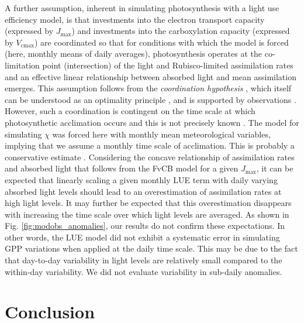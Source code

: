 \documentclass{myreport}
\newcommand{\vcmax}{$V_{\text{cmax}}$}
\newcommand{\jmax}{$J_{\text{max}}$}
\begin{document}
A further assumption, inherent in simulating photosynthesis with a light use efficiency model, is that investments into the electron transport capacity (expressed by \jmax ) and investments into the carboxylation capacity (expressed by \vcmax ) are coordinated so that for conditions with which the model is forced (here, monthly means of daily averages), photosynthesis operates at the co-limitation point (intersection) of the light and Rubisco-limited assimilation rates and an effective linear relationship between absorbed light and mean assimilation emerges. This assumption follows from the \textit{coordination hypothesis} \citep{chen93, haxeltine96}, which itself can be understood as an optimality principle \citep{haxeltine96}, and is supported by observations \citep{maire12po}. However, such a coordination is contingent on the time scale at which photosynthetic acclimation occurs and this is not precisely known \citep{smithdukes13gcb, way14}. The model for simulating $\chi$ was forced here with monthly mean meteorological variables, implying that we assume a monthly time scale of acclimation. This is probably a conservative estimate \citep{smithdukes17, veres84}. Considering the concave relationship of assimilation rates and absorbed light that follows from the FvCB model for a given \jmax , it can be expected that linearly scaling a given monthly LUE term with daily varying absorbed light levels should lead to an overestimation of assimilation rates at high light levels. It may further be expected that this overestimation disappears with increasing the time scale over which light levels are averaged. As shown in Fig. \ref{fig:modobs_anomalies}, our results do not confirm these expectations. In other words, the LUE model did not exhibit a systematic error in simulating GPP variations when applied at the daily time scale. This may be due to the fact that day-to-day variability in light levels are relatively small compared to the within-day variability. We did not evaluate variability in sub-daily anomalies.

\section{Conclusion}
\end{document}
